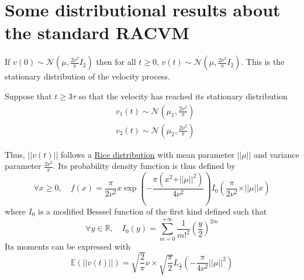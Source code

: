 \documentclass[11pt]{article}
\newcommand {\R}{\mathbb{R}}
\newcommand {\E}{\mathbb{E}}
\newcommand {\1}{\mathbb{1}}
\theoremstyle{definition}
\theoremstyle{remark}
\theoremstyle{remark}
\begin{document}
\section{Some distributional results about the standard RACVM}

If $v(0) \sim \mathcal{N}\left(\mu,\frac{2\nu^2}{\pi} I_2\right)$ then for all $t \geq 0$, $v(t) \sim \mathcal{N}\left(\mu,\frac{2\nu^2}{\pi} I_2\right)$. This is the stationary distribution of the velocity process.

Suppose that $t\geq 3\tau$ so that the velocity has reached its stationary distribution
\begin{align*}
	&v_1(t) \sim \mathcal{N}\left(\mu_1, \frac{2\nu^2}{\pi}\right) \\
	&v_2(t) \sim \mathcal{N}\left(\mu_2, \frac{2\nu^2}{\pi}\right)
\end{align*}

\begin{figure}[H]
	\centering
\end{figure}
Thus, $ \vert \vert v(t) \vert \vert$ follows a \href{https://en.wikipedia.org/wiki/Rice_distribution}{Rice distribution} with mean parameter $\vert \vert \mu \vert \vert$ and variance parameter $\frac{2\nu^2}{\pi}$. Its probability density function is thus defined by
\[\forall x \geq 0, \quad f(x)= \frac{\pi}{2\nu^2}x \exp\left(-\frac{\pi (x^2+ \vert \vert \mu \vert \vert^2)}{4\nu^2}\right) I_{0}\left(   \frac{\pi}{2\nu^2}\times \vert \vert \mu \vert \vert x \right)\]
where $I_0$ is a modified Besssel function of the first kind defined such that 
\[\forall y  \in \R, \quad I_0(y)=\sum_{m=0}^{+\infty} \frac{1}{m!^2}\left(\frac{y}{2}\right)^{2m}\]
Its moments can be expressed with
\[\E\left(\vert \vert v(t) \vert \vert\right)=\sqrt{\frac{2}{\pi}}\nu \times \sqrt{\frac{\pi}{2}} L_{\frac{1}{2}} \left( -\frac{\pi}{4\nu^2} \vert \vert \mu \vert \vert ^2 \right)\]
\end{document}
